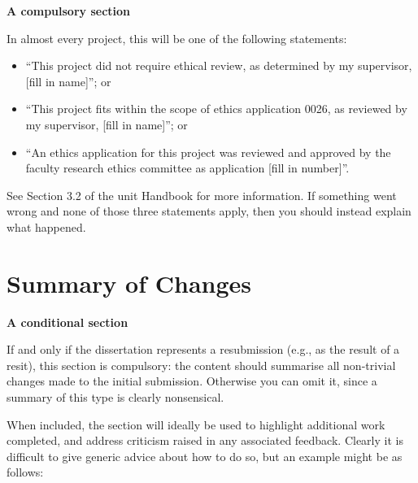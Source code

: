 \documentclass[oneside,%
                    author={Malak Hajji},
                    degree={BSc},
                    title={Designing An Accessible Computational Toolkit For Students},
                  subtitle={With Mixed Visual Abilities}]{dissertation}
\begin{document}
{\bf A compulsory section} 
\vspace{1cm} 

In almost every project, this will be one of the following statements:
    \begin{itemize}
        \item ``This project did not require ethical review, as determined by my supervisor, [fill in name]''; or
        \item ``This project fits within the scope of ethics application 0026, as reviewed by my supervisor, [fill in name]''; or
        \item ``An ethics application for this project was reviewed and approved by the faculty research ethics committee as application [fill in number]''.
    \end{itemize}
    
See Section 3.2 of the unit Handbook for more information. If something went wrong and none of those three statements apply, then you should instead explain what happened.



\chapter*{Summary of Changes}

{\bf A conditional section} 
\vspace{1cm} 

If and only if the dissertation represents a resubmission (e.g., as the result of
a resit), this section is compulsory: the content should summarise all
non-trivial changes made to the initial submission.  Otherwise you can
omit it, since a summary of this type is clearly nonsensical.

When included, the section will ideally be used to highlight additional
work completed, and address criticism raised in any associated feedback.
Clearly it is difficult to give generic advice about how to do so, but
an example might be as follows:
\end{document}
